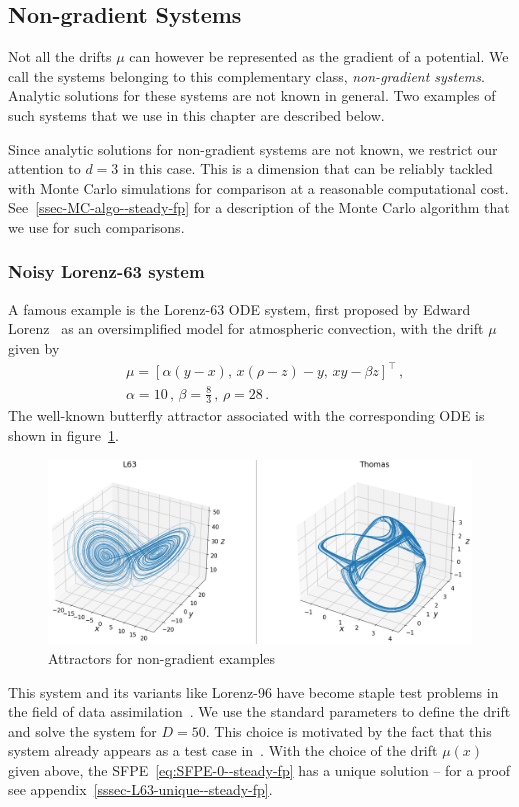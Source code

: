\subsection{Non-gradient Systems}
Not all the drifts $\mu$ can however be represented as the gradient of a potential. We call the systems belonging to this complementary class, \textit{non-gradient systems}. Analytic solutions for these systems are not known in general. Two examples of such systems that we use in this chapter are described below.

Since analytic solutions for non-gradient systems are not known, we restrict our attention to $d=3$ in this case. This is a dimension that can be reliably tackled with Monte Carlo simulations for comparison at a reasonable computational cost. See~\ref{ssec-MC-algo--steady-fp} for a description of the Monte Carlo algorithm that we use for such comparisons.

\subsubsection{Noisy Lorenz-63 system}
A famous example is the Lorenz-63 ODE system, first proposed by Edward Lorenz~\cite{lorenz1963deterministic} as an oversimplified model for atmospheric convection, with the drift $\mu$ given by
\begin{align}
    &\mu=[\alpha (y-x),\, x(\rho-z) - y,\, xy - \beta z]^\top \,, \label{eq:mu-L63--steady-fp}\\
    &\alpha = 10 \,, \, \beta = \frac{8}{3}\,, \, \rho=28 \,.
\end{align}
The well-known butterfly attractor associated with the corresponding ODE is shown in figure~\ref{fig:attractors--steady-fp}. 
\begin{figure}[t!]
    \centering\includegraphics[scale=0.55]{steady-fp/plots/steady-plots-attractor.png}
   \caption{Attractors for non-gradient examples} \label{fig:attractors--steady-fp}
\end{figure}
This system and its variants like Lorenz-96 have become staple test problems in the field of data assimilation~\cite{carrassi2022data, yeong2020particle}. We use the standard parameters to define the drift and solve the system for $D=50$. This choice is motivated by the fact that this system already appears as a test case in~\cite{chen2018efficient}. With the choice of the drift $\mu(x)$ given above, the SFPE~\eqref{eq:SFPE-0--steady-fp} has a unique solution -- for a proof see appendix~\ref{sssec-L63-unique--steady-fp}.

